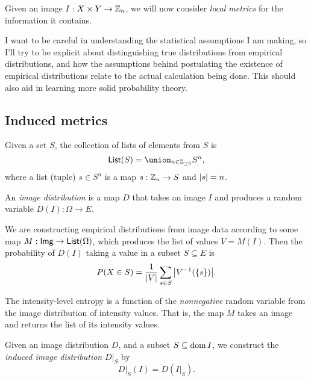 \documentclass[../notebook.tex]{subfiles}
\begin{document}

Given an image $I:X \times Y \to \mathbb{Z}_n$, we will now consider \emph{local
metrics} for the information it contains.

I want to be careful in understanding the statistical assumptions I am making,
so I'll try to be explicit about distinguishing true distributions from
empirical distributions, and how the assumptions behind postulating the
existence of empirical distributions relate to the actual calculation being
done. This should also aid in learning more solid probability theory.

\subsection{Induced metrics}

\begin{defn}[Lists]\label{def:lists}
  Given a set $S$, the collection of lists of elements from $S$ is
  \[
    \lists(S)
    = \union_{n \in \ZZ_{\ge 0}} S^n,
  \]
  where a list (tuple) $s \in S^n$ is a map $s:\mathbb{Z}_n \to S$ and $\abs{s} = n$.
\end{defn}

\begin{defn}
  An \emph{image distribution} is a map $D$ that takes an image $I$ and produces
  a random variable $D(I):\Omega \to E$.

  We are constructing empirical distributions from image data according to some
  map $M:\mathsf{Img} \to \mathsf{List}(\Omega)$, which produces the list of values $V =
  M(I)$. Then the probability of $D(I)$ taking a value in a subset $S \subseteq
  E$ is
  \[
    P(X \in S)
    = \frac{1}{\abs{V}}\sum_{s \in S} \abs{V^{-1}(\{s\})}.
  \]
\end{defn}

\begin{eg}
  The intensity-level entropy is a function of the \emph{nonnegative} random
  variable from the image distribution of intensity values. That is, the map $M$
  takes an image and returns the list of its intensity values.
\end{eg}

\begin{defn}
  Given an image distribution $D$, and a subset $S \subseteq \operatorname{\mathrm{dom}} I$, we
  construct the \emph{induced image distribution} $D|_S$ by
  \begin{equation}
    D|_S(I)
    = D(I|_S).
    \label{eq:inddist}
  \end{equation}
\end{defn}
\end{document}
